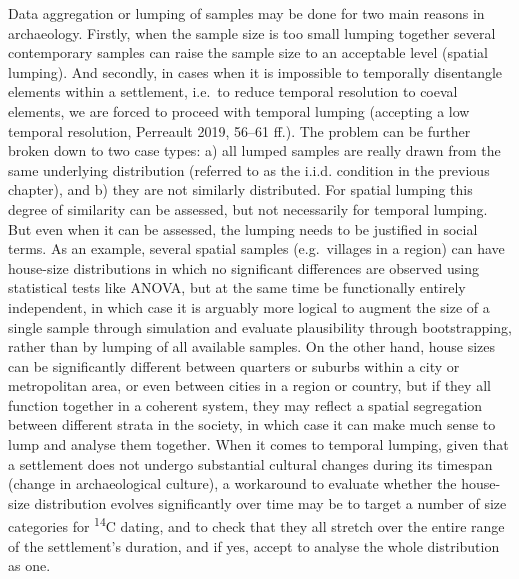 \documentclass[
  12pt,
  a4paper, twoside]{book}
\begin{document}
Data aggregation or lumping of samples may be done for two main reasons in archaeology. Firstly, when the sample size is too small lumping together several contemporary samples can raise the sample size to an acceptable level (spatial lumping). And secondly, in cases when it is impossible to temporally disentangle elements within a settlement, i.e.~to reduce temporal resolution to coeval elements, we are forced to proceed with temporal lumping (accepting a low temporal resolution, Perreault 2019, 56--61 ff.). The problem can be further broken down to two case types: a) all lumped samples are really drawn from the same underlying distribution (referred to as the i.i.d. condition in the previous chapter), and b) they are not similarly distributed. For spatial lumping this degree of similarity can be assessed, but not necessarily for temporal lumping. But even when it can be assessed, the lumping needs to be justified in social terms. As an example, several spatial samples (e.g.~villages in a region) can have house-size distributions in which no significant differences are observed using statistical tests like ANOVA, but at the same time be functionally entirely independent, in which case it is arguably more logical to augment the size of a single sample through simulation and evaluate plausibility through bootstrapping, rather than by lumping of all available samples. On the other hand, house sizes can be significantly different between quarters or suburbs within a city or metropolitan area, or even between cities in a region or country, but if they all function together in a coherent system, they may reflect a spatial segregation between different strata in the society, in which case it can make much sense to lump and analyse them together. When it comes to temporal lumping, given that a settlement does not undergo substantial cultural changes during its timespan (change in archaeological culture), a workaround to evaluate whether the house-size distribution evolves significantly over time may be to target a number of size categories for \textsuperscript{14}C dating, and to check that they all stretch over the entire range of the settlement's duration, and if yes, accept to analyse the whole distribution as one.
\end{document}
